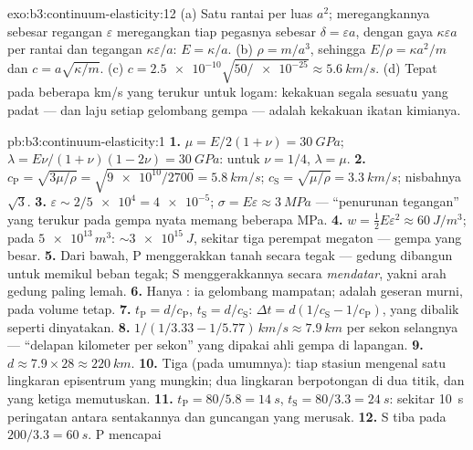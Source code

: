 \begin{solution}{exo:b3:continuum-elasticity:12}
(a) Satu rantai per luas $a^2$; meregangkannya sebesar regangan
$\varepsilon$ meregangkan tiap pegasnya sebesar $\delta = \varepsilon a$,
dengan gaya $\kappa
\varepsilon a$ per rantai dan tegangan $\kappa\varepsilon/a$: $E =
\kappa/a$. (b) $\rho = m/a^3$, sehingga $E/\rho = \kappa a^2/m$ dan $c =
a\sqrt{\kappa/m}$. (c) $c = \num{2.5e-10}\sqrt{50/\num{e-25}} \approx
\qty{5.6}{km/s}$. (d) Tepat pada beberapa km/s yang terukur untuk logam:
kekakuan segala sesuatu yang padat --- dan laju setiap gelombang gempa
--- adalah kekakuan ikatan kimianya.
\end{solution}

\begin{solution}{pb:b3:continuum-elasticity:1}
\textbf{1.} $\mu = E/2(1+\nu) = \qty{30}{GPa}$; $\lambda =
E\nu/(1+\nu)(1-2\nu) = \qty{30}{GPa}$: untuk $\nu = 1/4$, $\lambda =
\mu$.
\textbf{2.} $c_{\text{P}} = \sqrt{3\mu/\rho} = \sqrt{\num{9e10}/2700}
= \qty{5.8}{km/s}$; $c_{\text{S}} = \sqrt{\mu/\rho} =
\qty{3.3}{km/s}$; nisbahnya $\sqrt3$.
\textbf{3.} $\varepsilon \sim 2/\num{5e4} = \num{4e-5}$; $\sigma =
E\varepsilon \approx \qty{3}{MPa}$ --- ``penurunan tegangan'' yang
terukur pada gempa nyata memang beberapa MPa.
\textbf{4.} $w = \tfrac12 E\varepsilon^2 \approx \qty{60}{J/m^3}$;
pada $\num{5e13}{}\,\unit{m^3}$: $\sim\qty{3e15}{J}$, sekitar
tiga perempat megaton --- gempa yang besar.
\textbf{5.} Dari bawah, P menggerakkan tanah secara tegak --- gedung
dibangun untuk memikul beban tegak; S menggerakkannya secara
\emph{mendatar}, yakni arah gedung paling lemah.
\textbf{6.} Hanya : ia gelombang mampatan; 
adalah geseran murni, pada volume tetap.
\textbf{7.} $t_{\text{P}} = d/c_{\text{P}}$, $t_{\text{S}} =
d/c_{\text{S}}$: $\Delta t = d(1/c_{\text{S}} - 1/c_{\text{P}})$,
yang dibalik seperti dinyatakan.
\textbf{8.} $1/(1/3.33 - 1/5.77)\,\unit{km/s} \approx
\qty{7.9}{km}$ per sekon selangnya --- ``delapan kilometer per sekon''
yang dipakai ahli gempa di lapangan.
\textbf{9.} $d \approx 7.9 \times 28 \approx \qty{220}{km}$.
\textbf{10.} Tiga (pada umumnya): tiap stasiun mengenal satu lingkaran
episentrum yang mungkin; dua lingkaran berpotongan di dua titik, dan
yang ketiga memutuskan.
\textbf{11.} $t_{\text{P}} = 80/5.8 = \qty{14}{s}$, $t_{\text{S}} =
80/3.3 = \qty{24}{s}$: sekitar \qty{10}{s} peringatan antara sentakannya
dan guncangan yang merusak.
\textbf{12.} S tiba pada $200/3.3 = \qty{60}{s}$. P mencapai

\end{solution}
